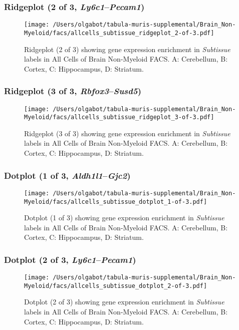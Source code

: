 \clearpage

\subsubsection{Ridgeplot (2 of 3, \emph{Ly6c1}--\emph{Pecam1})}
\begin{figure}[h]
\centering
\texttt{[image: /Users/olgabot/tabula-muris-supplemental/Brain\_Non-Myeloid/facs/allcells\_subtissue\_ridgeplot\_2-of-3.pdf]}

\caption{ Ridgeplot (2 of 3)  showing gene expression enrichment in \emph{Subtissue} labels in All Cells of Brain Non-Myeloid FACS. A: Cerebellum, B: Cortex, C: Hippocampus, D: Striatum.}
\end{figure}


\clearpage

\subsubsection{Ridgeplot (3 of 3, \emph{Rbfox3}--\emph{Susd5})}
\begin{figure}[h]
\centering
\texttt{[image: /Users/olgabot/tabula-muris-supplemental/Brain\_Non-Myeloid/facs/allcells\_subtissue\_ridgeplot\_3-of-3.pdf]}

\caption{ Ridgeplot (3 of 3)  showing gene expression enrichment in \emph{Subtissue} labels in All Cells of Brain Non-Myeloid FACS. A: Cerebellum, B: Cortex, C: Hippocampus, D: Striatum.}
\end{figure}


\clearpage

\subsubsection{Dotplot (1 of 3, \emph{Aldh1l1}--\emph{Gjc2})}
\begin{figure}[h]
\centering
\texttt{[image: /Users/olgabot/tabula-muris-supplemental/Brain\_Non-Myeloid/facs/allcells\_subtissue\_dotplot\_1-of-3.pdf]}

\caption{ Dotplot (1 of 3)  showing gene expression enrichment in \emph{Subtissue} labels in All Cells of Brain Non-Myeloid FACS. A: Cerebellum, B: Cortex, C: Hippocampus, D: Striatum.}
\end{figure}


\clearpage

\subsubsection{Dotplot (2 of 3, \emph{Ly6c1}--\emph{Pecam1})}
\begin{figure}[h]
\centering
\texttt{[image: /Users/olgabot/tabula-muris-supplemental/Brain\_Non-Myeloid/facs/allcells\_subtissue\_dotplot\_2-of-3.pdf]}

\caption{ Dotplot (2 of 3)  showing gene expression enrichment in \emph{Subtissue} labels in All Cells of Brain Non-Myeloid FACS. A: Cerebellum, B: Cortex, C: Hippocampus, D: Striatum.}
\end{figure}


